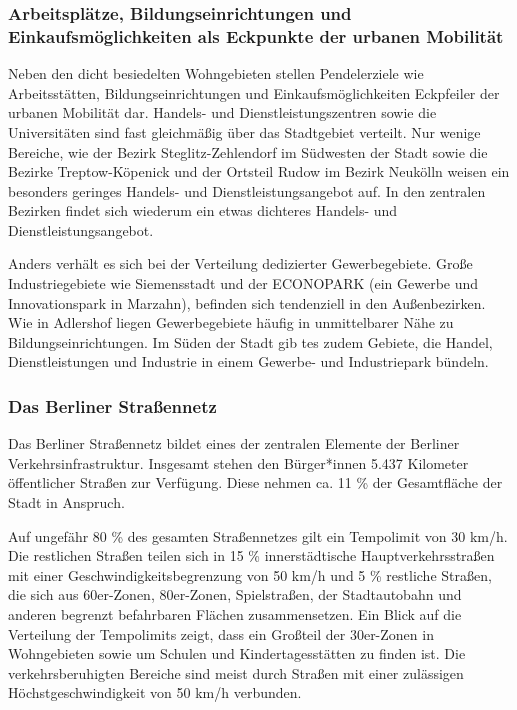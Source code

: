 \subsubsection{Arbeitsplätze, Bildungseinrichtungen und Einkaufsmöglichkeiten als Eckpunkte der urbanen Mobilität}

Neben den dicht besiedelten Wohngebieten stellen Pendelerziele wie Arbeitsstätten, Bildungseinrichtungen und Einkaufsmöglichkeiten Eckpfeiler der urbanen Mobilität dar. Handels- und Dienstleistungszentren sowie die Universitäten sind fast gleichmäßig über das Stadtgebiet verteilt. Nur wenige Bereiche, wie der Bezirk Steglitz-Zehlendorf im Südwesten der Stadt sowie die Bezirke Treptow-Köpenick und der Ortsteil Rudow im Bezirk Neukölln weisen ein besonders geringes Handels- und Dienstleistungsangebot auf. In den zentralen Bezirken findet sich wiederum ein etwas dichteres Handels- und Dienstleistungsangebot.

Anders verhält es sich bei der Verteilung dedizierter Gewerbegebiete. Große Industriegebiete wie Siemensstadt und der ECONOPARK (ein Gewerbe und Innovationspark in Marzahn), befinden sich tendenziell in den Außenbezirken. Wie in Adlershof liegen Gewerbegebiete häufig in unmittelbarer Nähe zu Bildungseinrichtungen. Im Süden der Stadt gib tes zudem Gebiete, die Handel, Dienstleistungen und Industrie in einem Gewerbe- und Industriepark bündeln.


\subsubsection{Das Berliner Straßennetz}

Das Berliner Straßennetz bildet eines der zentralen Elemente der Berliner Verkehrsinfrastruktur. Insgesamt stehen den  Bürger*innen 5.437 Kilometer öffentlicher Straßen zur Verfügung. Diese nehmen ca. 11 \% der Gesamtfläche der Stadt in Anspruch.

 Auf ungefähr 80 \% des gesamten Straßennetzes gilt %
 ein Tempolimit von 30 km/h. Die restlichen Straßen teilen sich in 15 \% innerstädtische Hauptverkehrsstraßen mit einer Geschwindigkeitsbegrenzung von 50 km/h und 5 \% restliche Straßen, die sich aus 60er-Zonen, 80er-Zonen, Spielstraßen, der Stadtautobahn und anderen begrenzt befahrbaren Flächen zusammensetzen. Ein Blick auf die Verteilung der Tempolimits zeigt, dass ein Großteil der 30er-Zonen in Wohngebieten sowie um Schulen und Kindertagesstätten zu finden ist. Die verkehrsberuhigten Bereiche sind meist durch Straßen mit einer zulässigen Höchstgeschwindigkeit von 50 km/h verbunden.

